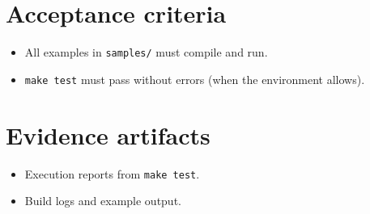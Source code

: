 \documentclass[11pt,a4paper]{article}
\begin{document}
\section{Acceptance criteria}
\begin{itemize}
    \item All examples in \texttt{samples/} must compile and run.
    \item \texttt{make test} must pass without errors (when the environment allows).
\end{itemize}

\section{Evidence artifacts}
\begin{itemize}
    \item Execution reports from \texttt{make test}.
    \item Build logs and example output.
\end{itemize}
\end{document}
